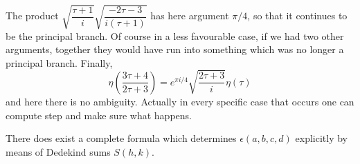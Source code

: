 The product $\sqrt{\dfrac{\tau+1}{i}} \sqrt{\dfrac{- 2\tau -3}{i (\tau
    +1)}}$ has here argument $\pi/4$, so that it continues to be the
principal branch. Of course in a less favourable case, if we had two
other arguments, together they would have run into something which was
no longer a principal branch. Finally,
$$
\eta \left(\frac{3 \tau+4}{2 \tau+3} \right)= e^{\pi i /4}
\sqrt{\frac{2 \tau+3}{i}} \eta (\tau)
$$
and here there is no ambiguity. Actually in every specific case that
occurs one can compute step and make sure what happens. 

There does exist a complete formula which determines $\epsilon (a, b, c, d)$
explicitly by means of Dedekind sums $S(h, k)$. 

